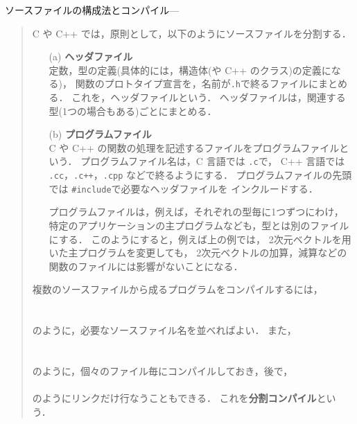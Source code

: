 \documentclass[11pt,a4,epsf]{jarticle}
\begin{document}
ソースファイルの構成法とコンパイル\leaders\hbox{---}\hfill\kern0pt %
\begin{quote}

C や C++ では，原則として，以下のようにソースファイルを分割する．

\begin{enumerate}

 \item[(a)] {\bf ヘッダファイル}	\\
定数，型の定義(具体的には，構造体(や C++ のクラス)の定義になる)，
関数のプロトタイプ宣言を，名前が\verb+.h+で終るファイルにまとめる．
これを，ヘッダファイルという．
ヘッダファイルは，関連する型(1つの場合もある)ごとにまとめる．

 \item[(b)] {\bf プログラムファイル}	\\
C や C++ の関数の処理を記述するファイルをプログラムファイルという．
プログラムファイル名は，C 言語では \verb+.c+で，
C++ 言語では \verb+.cc+，\verb|.c++|，\verb+.cpp+ などで終るようにする．
プログラムファイルの先頭では {\tt \#include}で必要なヘッダファイルを
インクルードする．

プログラムファイルは，例えば，それぞれの型毎に1つずつにわけ，
特定のアプリケーションの主プログラムなども，型とは別のファイルにする．
このようにすると，例えば上の例では，
2次元ベクトルを用いた主プログラムを変更しても，
2次元ベクトルの加算，減算などの関数のファイルには影響がないことになる．

\end{enumerate}

複数のソースファイルから成るプログラムをコンパイルするには，	\\
\hspace*{10mm}{\tt \% cc vector2c.c vec2ex1c.c}	\\
\hspace*{10mm}{\tt \% c++ vector2p.cc vec2ex1p.cc}	\\
のように，必要なソースファイル名を並べればよい．
また，\\
\hspace*{10mm}{\tt \% cc -c vector2c.c}	\\
\hspace*{10mm}{\tt \% cc -c vec2ex1c.c}	\\
のように，個々のファイル毎にコンパイルしておき，後で，	\\
\hspace*{10mm}{\tt \% cc vector2c.o vec2ex1c.o}	\\
のようにリンクだけ行なうこともできる．
これを{\bf 分割コンパイル}という．
\end{quote}
\hrulefill
\end{document}
